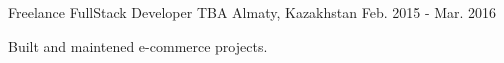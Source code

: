 \begin{cventries}
  \cventry
    {Freelance FullStack Developer} %
    {TBA} %
    {Almaty, Kazakhstan} %
    {Feb. 2015 - Mar. 2016} %
    {
      \begin{cvitems} %
        \item {Built and maintened e-commerce projects.}
      \end{cvitems}
    }

\end{cventries}
